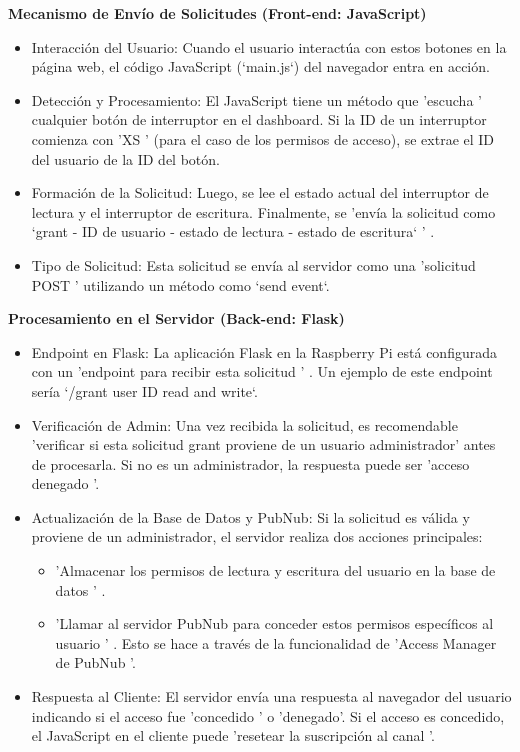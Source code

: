 \documentclass{report}
\begin{document}
\textbf{Mecanismo de Envío de Solicitudes (Front-end: JavaScript)}
\begin{itemize}
    \item Interacción del Usuario:  Cuando el usuario interactúa con estos botones en la página web, el código JavaScript (`main.js`) del navegador entra 
    en acción.
    \item Detección y Procesamiento:  El JavaScript tiene un método que  'escucha ' cualquier botón de interruptor en el dashboard. Si la ID de un 
    interruptor comienza con  'XS ' (para el caso de los permisos de acceso), se extrae el ID del usuario de la ID del botón.
    \item Formación de la Solicitud:  Luego, se lee el estado actual del interruptor de lectura y el interruptor de escritura. Finalmente, se  
    'envía la solicitud como `grant - ID de usuario - estado de lectura - estado de escritura` ' .
    \item Tipo de Solicitud:  Esta solicitud se envía al servidor como una   'solicitud POST '  utilizando un método como `send event`.
\end{itemize}

\textbf{Procesamiento en el Servidor (Back-end: Flask)}
\begin{itemize}
    \item Endpoint en Flask:  La aplicación Flask en la Raspberry Pi está configurada con un   'endpoint para recibir esta solicitud ' . Un ejemplo de 
    este endpoint sería `/grant user ID read and write`.
    \item Verificación de Admin:  Una vez recibida la solicitud, es recomendable  'verificar si esta solicitud grant proviene de un usuario administrador' 
    antes de procesarla. Si no es un administrador, la respuesta puede ser  'acceso denegado '.
    \item Actualización de la Base de Datos y PubNub:  Si la solicitud es válida y proviene de un administrador, el servidor realiza dos acciones principales:
    \begin{itemize}
        \item  'Almacenar los permisos de lectura y escritura del usuario en la base de datos ' .
        \item  'Llamar al servidor PubNub para conceder estos permisos específicos al usuario ' . Esto se hace a través de la funcionalidad de 
        'Access Manager de PubNub '.
    \end{itemize}
    \item Respuesta al Cliente:  El servidor envía una respuesta al navegador del usuario indicando si el acceso fue  'concedido ' o  'denegado'. 
    Si el acceso es concedido, el JavaScript en el cliente puede  'resetear la suscripción al canal '.
\end{itemize}
\end{document}
